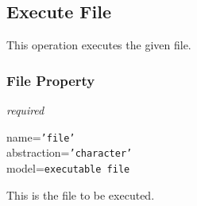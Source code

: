 %
%
%
%
%
%

\subsection{Execute File}
\label{execute_file_heading}

This operation executes the given file.

\subsubsection{File Property}

\emph{required}

name=\texttt{'file'}\\
abstraction=\texttt{'character'}\\
model=\texttt{executable file}

This is the file to be executed.
